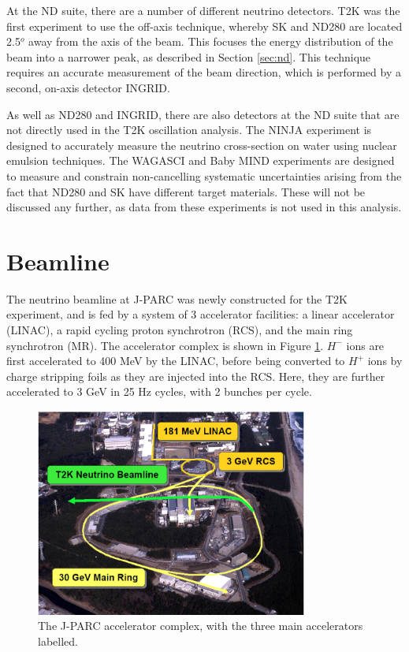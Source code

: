 At the ND suite, there are a number of different neutrino detectors. T2K was the first experiment to use the off-axis technique, whereby SK and ND280 are located 2.5$^o$ away from the axis of the beam. This focuses the energy distribution of the beam into a narrower peak, as described in Section \ref{sec:nd}. This technique requires an accurate measurement of the beam direction, which is performed by a second, on-axis detector INGRID.

As well as ND280 and INGRID, there are also detectors at the ND suite that are not directly used in the T2K oscillation analysis. The NINJA\cite{ninja} experiment is designed to accurately measure the neutrino cross-section on water using nuclear emulsion techniques. The WAGASCI\cite{wagasci} and Baby MIND\cite{babymind} experiments are designed to measure and constrain non-cancelling systematic uncertainties arising from the fact that ND280 and SK have different target materials. These will not be discussed any further, as data from these experiments is not used in this analysis.

\section{Beamline}\label{sec:beam}

The neutrino beamline at J-PARC \cite{jparc} was newly constructed for the T2K experiment, and is fed by a system of 3 accelerator facilities: a linear accelerator (LINAC), a rapid cycling proton synchrotron (RCS), and the main ring synchrotron (MR). The accelerator complex is shown in Figure \ref{jparc}. $H^{-}$ ions are first accelerated to 400 MeV by the LINAC, before being converted to $H^{+}$ ions by charge stripping foils as they are injected into the RCS. Here, they are further accelerated to 3 GeV in 25 Hz cycles, with 2 bunches per cycle.

\begin{figure}[!htbp]
\centering
\includegraphics*[width=0.8\textwidth,clip]{figs/jparc}
\caption{The J-PARC accelerator complex, with the three main accelerators labelled.} \label{jparc}
\end{figure}

